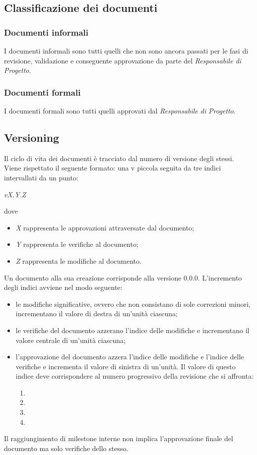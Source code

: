 \subsection{Classificazione dei documenti}
\subsubsection{Documenti informali}
I documenti informali sono tutti quelli che non sono ancora passati per le fasi di revisione, validazione e conseguente approvazione da parte del \textit{Responsabile di Progetto}.

\subsubsection{Documenti formali}
I documenti formali sono tutti quelli approvati dal \textit{Responsabile di Progetto}.

\subsection{Versioning}
Il ciclo di vita dei documenti è tracciato dal numero di versione degli stessi.\\
Viene rispettato il seguente formato: una v piccola seguita da tre indici intervallati da un punto:
\begin{center}
	\textit{vX.Y.Z}
\end{center}
dove
\begin{itemize}
	\item \textit{X} rappresenta le approvazioni attraversate dal documento;
	\item \textit{Y} rappresenta le verifiche al documento;
	\item \textit{Z} rappresenta le modifiche al documento.
\end{itemize}
Un documento alla sua creazione corrisponde alla versione 0.0.0. L’incremento degli indici avviene nel modo seguente:
\begin{itemize}
	\item le modifiche significative, ovvero che non consistano di sole correzioni minori, incrementano il valore di destra di un'unità ciascuna;
	\item le verifiche del documento azzerano l'indice delle modifiche e incrementano il valore centrale di un'unità ciascuna;
	\item l'approvazione del documento azzera l'indice delle modifiche e l'indice delle verifiche e incrementa il valore di sinistra di un'unità. Il valore di questo indice deve corrispondere al numero progressivo della revisione che si affronta:
	\begin{enumerate}
		\item \RR
		\item \RP
		\item \RQ
		\item \RA
	\end{enumerate} 
\end{itemize}
Il raggiungimento di milestone interne non implica l'approvazione finale del documento ma solo verifiche dello stesso.

